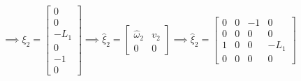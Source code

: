 \begin{equation*}
    \implies
    \xi_{2}
    =
    \begin{bmatrix}
        0    \\
        0    \\
        -L_1 \\
        0    \\
        -1   \\
        0
    \end{bmatrix}
    \implies
    \widehat{\xi}_{2}
    =
    \begin{bmatrix}
        \widehat{\omega}_{2} & v_2 \\
        0                    & 0
    \end{bmatrix}
    \implies
    \boxed{
        \widehat{\xi}_{2}
        =
        \begin{bmatrix}
            0 & 0 & -1 & 0    \\
            0 & 0 & 0  & 0    \\
            1 & 0 & 0  & -L_1 \\
            0 & 0 & 0  & 0
        \end{bmatrix}
    }
\end{equation*}


